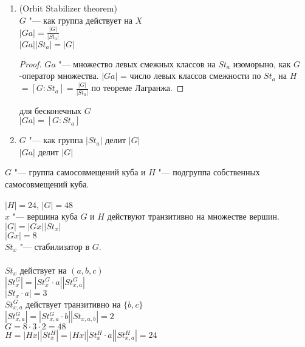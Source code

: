 \begin{conseq}
\begin{enumerate}
\item (Orbit Stabilizer theorem)\\
$G$ "--- как группа действует на $X$\\
$|Ga| = \frac{|G|}{|St_a|}$\\
$|Ga||St_a| = |G|$\\
\begin{proof}
$Ga$ "--- множество левых смежных классов на $St_a$ изоморыно, как $G$-оператор
множества.
$|Ga|$ = число левых классов смежности по $St_a$ на $H$
$= [G \colon St_a] = \frac{|G|}{|St_a|}$ по теореме Лагранжа.
\end{proof}
\begin{Rem}
для бесконечных $G$\\
$|Ga| = [G \colon St_a]$\\
\end{Rem}
\item
$G$ "--- как группа $|St_a|$ делит $|G|$\\
                    $|Ga|$ делит $|G|$\\
\end{enumerate}
\end{conseq}
\begin{exmp}
$G$ "--- группа самосовмещений куба и $H$ "--- подгруппа собственных самосовмещений куба.

$|H| = 24$, $|G| = 48$\\

$x$ "--- вершина куба $G$ и $H$ действуют транзитивно на множестве вершин.\\
$|G| = |Gx||St_x|$\\
$|Gx| = 8$\\
$St_x$ "--- стабилизатор в $G$.\\
\\
$St_x$ действует на $(a, b, c)$\\
$|St_x^{G}| = |St_x^{G}\cdot a||St_{x, a}^{G}|$\\
$|St_x \cdot a| = 3$\\
$St_{x, a}^{G}$ действует транзитивно на $\{b, c\}$\\
$|St_{x, a}^{G}| = |St_{x, a}^{G}\cdot b||St_{x, a, b}| = 2$\\

$G = 8 \cdot 3 \cdot 2 = 48$\\
$H = |Hx||St_x^{H}| = |Hx||St_x^{H}\cdot a||St_{x,a}^{H}| = 24$\\
\end{exmp}
